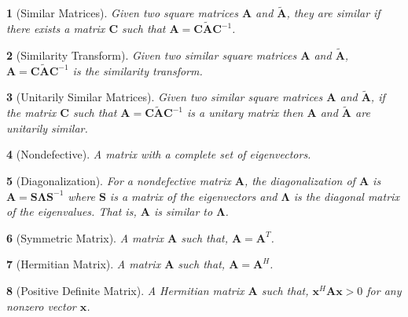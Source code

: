 \documentclass{article}
\theoremstyle{bolddef}
\newtheorem*{definition}{}
\begin{document}
\begin{definition}[Similar Matrices]
    Given two square matrices $\mathbf{A}$ and $\mathbf{\tilde{A}}$,
    they are similar if there exists a matrix $\mathbf{C}$ such that
    $\mathbf{A} = \mathbf{C} \mathbf{\tilde{A}} \mathbf{C}^{-1}$.
\end{definition}

\begin{definition}[Similarity Transform]
    Given two similar square matrices $\mathbf{A}$ and $\mathbf{\tilde{A}}$,
    $\mathbf{A} = \mathbf{C} \mathbf{\tilde{A}} \mathbf{C}^{-1}$ is the similarity transform.
\end{definition}

\begin{definition}[Unitarily Similar Matrices]
    Given two similar square matrices $\mathbf{A}$ and $\mathbf{\tilde{A}}$,
    if the matrix $\mathbf{C}$ such that $\mathbf{A} = \mathbf{C} \mathbf{\tilde{A}} \mathbf{C}^{-1}$
    is a unitary matrix then $\mathbf{A}$ and $\mathbf{\tilde{A}}$ are unitarily similar.
\end{definition}

\begin{definition}[Nondefective]
    A matrix with a complete set of eigenvectors.
\end{definition}

\begin{definition}[Diagonalization]
    For a nondefective matrix $\mathbf{A}$, the diagonalization of $\mathbf{A}$ is $\mathbf{A} = \mathbf{S} \mathbf{\Lambda} \mathbf{S}^{-1}$
    where $\mathbf{S}$ is a matrix of the eigenvectors and $\mathbf{\Lambda}$ is the diagonal matrix of the eigenvalues.
    That is, $\mathbf{A}$ is similar to $\mathbf{\Lambda}$.
\end{definition}

\begin{definition}[Symmetric Matrix]
    A matrix $\mathbf{A}$ such that, $\mathbf{A} = \mathbf{A}^{T}$.
\end{definition}

\begin{definition}[Hermitian Matrix]
    A matrix $\mathbf{A}$ such that, $\mathbf{A} = \mathbf{A}^{H}$.
\end{definition}

\begin{definition}[Positive Definite Matrix]
    A Hermitian matrix $\mathbf{A}$ such that, $\mathbf{x}^{H} \mathbf{A} \mathbf{x} > 0$
    for any nonzero vector $\mathbf{x}$.
\end{definition}
\end{document}
